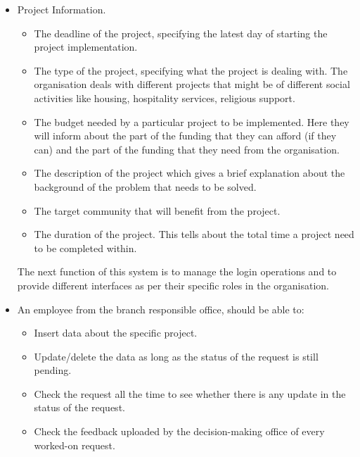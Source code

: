 \begin{itemize}
 \item Project Information. 
 \begin{itemize}
    \item The deadline of the project, specifying the latest day of starting the project implementation.
    \item The type of the project, specifying what the project is dealing with. The organisation deals with different projects that might be of different social activities like housing, hospitality services, religious support.
    \item The budget needed by a particular project to be implemented. Here they will inform about the part of the funding that they can afford (if they can) and the part of the funding that they need from the organisation.
    \item The description of the project which gives a brief explanation about the background of the problem that needs to be solved.
    \item The target community that will benefit from the project.
    \item The duration of the project. This tells about the total time a project need to be completed within.

\end{itemize}

The next function of this system is to manage the login operations and to provide different interfaces as per their specific roles in the organisation.
\item An employee from the branch responsible office, should be able to:
\begin{itemize}
    \item Insert data about the specific project.
    \item Update/delete the data as long as the status of the request is still pending.
    \item Check the request all the time to see whether there is any update in the status of the request.
    \item Check the feedback uploaded by the decision-making office of every worked-on request. 
\end{itemize}


\end{itemize}

